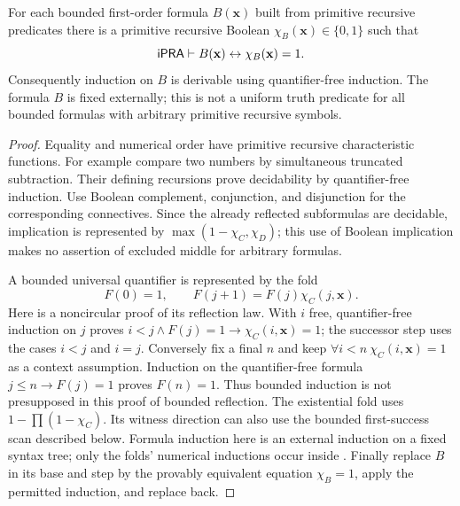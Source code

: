 \begin{lemma}
\label{lem:reflection}
For each bounded first-order formula $B(\mathbf x)$ built from primitive
recursive predicates there is a primitive recursive Boolean
$\chi_B(\mathbf x)\in\{0,1\}$ such that
\[
 \mathsf{iPRA}\vdash B(\mathbf x)\leftrightarrow \chi_B(\mathbf x)=1.
\]
Consequently induction on $B$ is derivable using quantifier-free induction.
The formula $B$ is fixed externally; this is not a uniform truth predicate
for all bounded formulas with arbitrary primitive recursive symbols.
\end{lemma}
\begin{proof}
Equality and numerical order have primitive recursive characteristic
functions. For example compare two numbers by simultaneous truncated
subtraction. Their defining recursions prove decidability by
quantifier-free induction. Use Boolean complement, conjunction, and
disjunction for the corresponding connectives. Since the already
reflected subformulas are decidable, implication is represented by
$\max(1-\chi_C,\chi_D)$; this use of Boolean implication makes no assertion
of excluded middle for arbitrary formulas.

A bounded universal quantifier is represented by the fold
\[
 F(0)=1,\qquad F(j+1)=F(j)\chi_C(j,\mathbf x).
\]
Here is a noncircular proof of its reflection law. With $i$ free,
quantifier-free induction on $j$ proves
$i<j\wedge F(j)=1\longrightarrow\chi_C(i,\mathbf x)=1$; the successor
step uses the cases $i<j$ and $i=j$. Conversely fix a final $n$ and
keep $\forall i<n\ \chi_C(i,\mathbf x)=1$ as a context assumption.
Induction on the quantifier-free formula $j\le n\longrightarrow F(j)=1$
proves $F(n)=1$. Thus bounded induction is not presupposed in this
proof of bounded reflection. The existential fold uses
$1-\prod(1-\chi_C)$. Its witness direction can also use the bounded
first-success scan described below. Formula induction here is an external
induction on a fixed syntax tree; only the folds' numerical inductions
occur inside \iPRA. Finally replace $B$ in its base and step by the
provably equivalent equation $\chi_B=1$, apply the permitted induction,
and replace back.
\end{proof}

